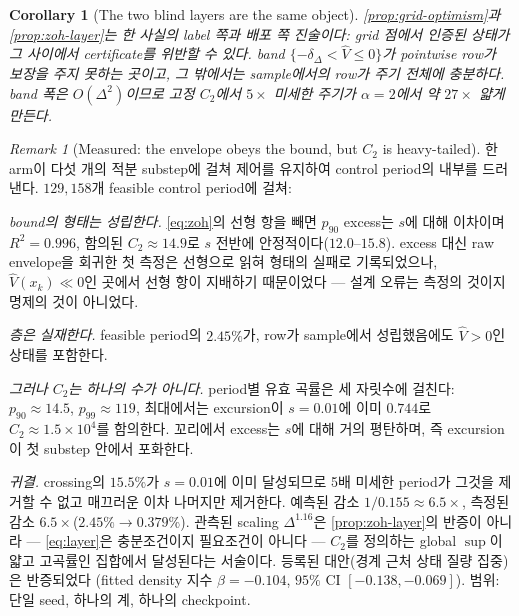 \documentclass[11pt]{article}
\theoremstyle{plain}
\newtheorem{corollary}[theorem]{Corollary}
\theoremstyle{definition}
\theoremstyle{remark}
\newtheorem{remark}[theorem]{Remark}
\newcommand{\Vhat}{\widehat V}
\begin{document}
\begin{corollary}[The two blind layers are the same object]\label{cor:two-layers}
\cref{prop:grid-optimism}과 \cref{prop:zoh-layer}는 한 사실의 label 쪽과 배포 쪽 진술이다: grid
점에서 인증된 상태가 그 사이에서 certificate를 위반할 수 있다. band $\{-\delta_\Delta<\Vhat\le0\}$가
pointwise row가 보장을 주지 못하는 곳이고, 그 밖에서는 sample에서의 row가 주기 전체에 충분하다.
band 폭은 $O(\Delta^2)$이므로 고정 $C_2$에서 $5\times$ 미세한 주기가 $\alpha=2$에서 약 $27\times$
얇게 만든다.
\end{corollary}

\begin{remark}[Measured: the envelope obeys the bound, but $C_2$ is heavy-tailed]\label{rem:layer-measured}
한 arm이 다섯 개의 적분 substep에 걸쳐 제어를 유지하여 control period의 내부를 드러낸다.
$129{,}158$개 feasible control period에 걸쳐:

\emph{bound의 형태는 성립한다.} \cref{eq:zoh}의 선형 항을 빼면 $p_{90}$ excess는 $s$에 대해
이차이며 $R^2=0.996$, 함의된 $C_2\approx14.9$로 $s$ 전반에 안정적이다($12.0$--$15.8$). excess 대신
raw envelope을 회귀한 첫 측정은 선형으로 읽혀 형태의 실패로 기록되었으나, $\Vhat(x_k)\ll0$인 곳에서
선형 항이 지배하기 때문이었다 --- 설계 오류는 측정의 것이지 명제의 것이 아니었다.

\emph{층은 실재한다.} feasible period의 $2.45\%$가, row가 sample에서 성립했음에도 $\Vhat>0$인
상태를 포함한다.

\emph{그러나 $C_2$는 하나의 수가 아니다.} period별 유효 곡률은 세 자릿수에 걸친다:
$p_{90}\approx14.5$, $p_{99}\approx119$, 최대에서는 excursion이 $s=0.01$에 이미 $0.744$로
$C_2\approx1.5\times10^4$를 함의한다. 꼬리에서 excess는 $s$에 대해 거의 평탄하며, 즉 excursion이
첫 substep 안에서 포화한다.

\emph{귀결.} crossing의 $15.5\%$가 $s=0.01$에 이미 달성되므로 5배 미세한 period가 그것을 제거할 수
없고 매끄러운 이차 나머지만 제거한다. 예측된 감소 $1/0.155\approx6.5\times$, 측정된 감소
$6.5\times$($2.45\%\to0.379\%$). 관측된 scaling $\Delta^{1.16}$은 \cref{prop:zoh-layer}의 반증이
아니라 --- \cref{eq:layer}은 충분조건이지 필요조건이 아니다 --- $C_2$를 정의하는 global $\sup$이
얇고 고곡률인 집합에서 달성된다는 서술이다. 등록된 대안(경계 근처 상태 질량 집중)은 반증되었다
(fitted density 지수 $\beta=-0.104$, $95\%$ CI $[-0.138,-0.069]$). 범위: 단일 seed, 하나의 계,
하나의 checkpoint.
\end{remark}
\end{document}
